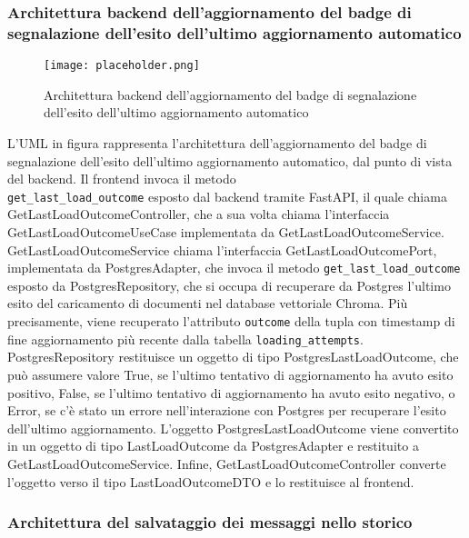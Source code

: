 \newpage


\subsubsection{Architettura backend dell’aggiornamento del badge di segnalazione dell’esito dell’ultimo aggiornamento automatico}
\label{sec:architettura_backend_badge_aggiornamento}

\begin{figure}[h]
    \centering
    \texttt{[image: placeholder.png]}
    \caption{Architettura backend dell’aggiornamento del badge di segnalazione dell’esito dell’ultimo aggiornamento automatico}
\end{figure}

L'UML in figura rappresenta l'architettura dell'aggiornamento del badge di segnalazione dell'esito dell'ultimo aggiornamento automatico, dal punto di vista del backend. Il frontend invoca il metodo\\ \texttt{get\_last\_load\_outcome} esposto dal backend tramite FastAPI, il quale chiama GetLastLoadOutcomeController, che a sua volta chiama l'interfaccia GetLastLoadOutcomeUseCase implementata da GetLastLoadOutcomeService. GetLastLoadOutcomeService chiama l'interfaccia GetLastLoadOutcomePort, implementata da PostgresAdapter, che invoca il metodo \texttt{get\_last\_load\_outcome} esposto da PostgresRepository, che si occupa di recuperare da Postgres l'ultimo esito del caricamento di documenti nel database vettoriale Chroma. Più precisamente, viene recuperato l'attributo \texttt{outcome} della tupla con timestamp di fine aggiornamento più recente dalla tabella \texttt{loading\_attempts}. PostgresRepository restituisce un oggetto di tipo PostgresLastLoadOutcome, che può assumere valore True, se l'ultimo tentativo di aggiornamento ha avuto esito positivo, False, se l'ultimo tentativo di aggiornamento ha avuto esito negativo, o Error, se c'è stato un errore nell'interazione con Postgres per recuperare l'esito dell'ultimo aggiornamento. L'oggetto PostgresLastLoadOutcome viene convertito in un oggetto di tipo LastLoadOutcome da PostgresAdapter e restituito a GetLastLoadOutcomeService. Infine, GetLastLoadOutcomeController converte l'oggetto verso il tipo LastLoadOutcomeDTO e lo restituisce al frontend.

\newpage


\subsubsection{Architettura del salvataggio dei messaggi nello storico}
\label{sec:architettura_salvataggio_messaggi_storico}

